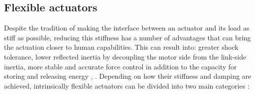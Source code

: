 \subsection{Flexible actuators}
Despite the tradition of making the interface between an actuator and its load as stiff as possible, reducing this stiffness has a number of advantages that can bring the actuation closer to human capabilities. This can result into: greater shock tolerance, lower reflected inertia by decoupling the motor side from the link-side inertia, more stable and accurate force control in addition to the capacity for storing and releasing energy \cite{garabini2011optimality}, \cite{chen2013optimal}. Depending on how their stiffness and damping are achieved, intrinsically flexible actuators can be divided into two main categories \cite{vanderborght2012variable}: \\

